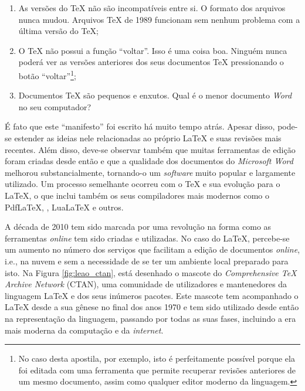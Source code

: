 \begin{enumerate}
    \item As versões do \TeX{} não são incompatíveis entre si. O formato dos arquivos nunca mudou. Arquivos \TeX{} de 1989 funcionam sem nenhum problema com a última versão do \TeX{};
    \item O \TeX{} não possui a função ``voltar''. Isso é uma coisa boa. Ninguém nunca poderá ver as versões anteriores dos seus documentos \TeX{} pressionando o botão ``voltar''\footnote{No caso desta apostila, por exemplo, isto é perfeitamente possível porque ela foi editada com uma ferramenta que permite recuperar revisões anteriores de um mesmo documento, assim como qualquer editor moderno da linguagem.};
    \item Documentos \TeX{} são pequenos e enxutos. Qual é o menor documento \textit{Word} no seu computador?
\end{enumerate}
\endgroup

É fato que este ``manifesto'' foi escrito há muito tempo atrás. Apesar disso, pode-se estender as ideias nele relacionadas ao próprio \LaTeX{} e suas revisões mais recentes. Além disso, deve-se observar também que muitas ferramentas de edição foram criadas desde então e que a qualidade dos documentos do \textit{Microsoft Word} melhorou substancialmente, tornando-o um \textit{software} muito popular e largamente utilizado. Um processo semelhante ocorreu com o \TeX{} e sua evolução para o \LaTeX{}, o que inclui também os seus compiladores mais modernos como o Pdf\LaTeX{}, \XeLaTeX{}, Lua\LaTeX{} e outros.

A década de 2010 tem sido marcada por uma revolução na forma como as ferramentas \textit{online} tem sido criadas e utilizadas. No caso do \LaTeX{}, percebe-se um aumento no número dos serviços que facilitam a edição de documentos \textit{online}, i.e., na nuvem e sem a necessidade de se ter um ambiente local preparado para isto. Na Figura \ref{fig:leao_ctan}, está desenhado o mascote do \textit{Comprehensive \TeX{} Archive Network} (CTAN), uma comunidade de utilizadores e mantenedores da linguagem \LaTeX{} e dos seus inúmeros pacotes. Este mascote tem acompanhado o \LaTeX{} desde a sua gênese no final dos anos 1970 e tem sido utilizado desde então na representação da linguagem, passando por todas as suas fases, incluindo a era mais moderna da computação e da \textit{internet}.

